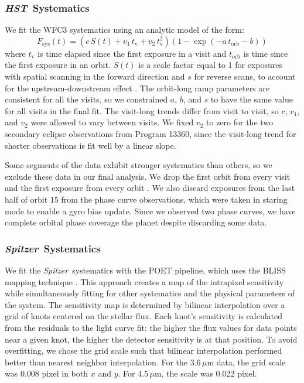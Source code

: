 \documentclass[twocolumn]{aastex61}
\newcommand{\project}[1]{\textsl{#1}}
\newcommand{\HST}{\project{HST}}
\newcommand{\Spitzer}{\project{Spitzer}}
\begin{document}
\subsubsection{\HST\ Systematics}
\label{sec:hst_sys}
We fit the WFC3 systematics using an analytic model of the form:
\begin{equation}
 F_\mathrm{sys}(t) = (c\,S(t) + v_1\,t_\mathrm{v} + v_2\,t_\mathrm{v}^2)(1 - \exp(-a\,t_\mathrm{orb} - b))
\end{equation}
where $t_\mathrm{v}$ is time elapsed since the first exposure in a visit and $t_\mathrm{orb}$ is time since the first exposure in an orbit. $S(t)$ is a scale factor equal to 1 for exposures with spatial scanning in the forward direction and $s$ for reverse scans, to account for the upstream-downstream effect \citep{mccullough12}. The orbit-long ramp parameters are consistent for all the visits, so we constrained $a$, $b$, and $s$ to have the same value for all visits in the final fit. The visit-long trends differ from visit to visit, so $c$, $v_1$, and $v_2$ were allowed to vary between visits. We fixed $v_2$ to zero for the two secondary eclipse observations from Program 13360, since the visit-long trend for shorter observations is fit well by a linear slope.

Some segments of the data exhibit stronger systematics than others, so we exclude these data in our final analysis. We drop the first orbit from every visit and the first exposure from every orbit \citep[following common practice; see e.g.][]{kreidberg14a}.  We also discard exposures from the last half of orbit 15 from the phase curve observations, which were taken in staring mode to enable a gyro bias update. Since we observed two phase curves, we have complete orbital phase coverage the planet despite discarding some data.

\subsubsection{\Spitzer\ Systematics}
We fit the \Spitzer\ systematics with the POET pipeline, which uses the BLISS mapping technique \citep{stevenson12}. This approach creates a map of the intrapixel sensitivity while simultaneously fitting for other systematics and the physical parameters of the system. The sensitivity map is determined by bilinear interpolation over a grid of knots centered on the stellar flux. Each knot's sensitivity is calculated from the residuals to the light curve fit: the higher the flux values for data points near a given knot, the higher the detector sensitivity is at that position.  To avoid overfitting, we chose the grid scale such that bilinear interpolation performed better than nearest neighbor interpolation. For the $3.6\,\mu$m data, the grid scale was 0.008 pixel in both $x$ and $y$. For $4.5\,\mu$m, the scale was 0.022 pixel.  
\end{document}
